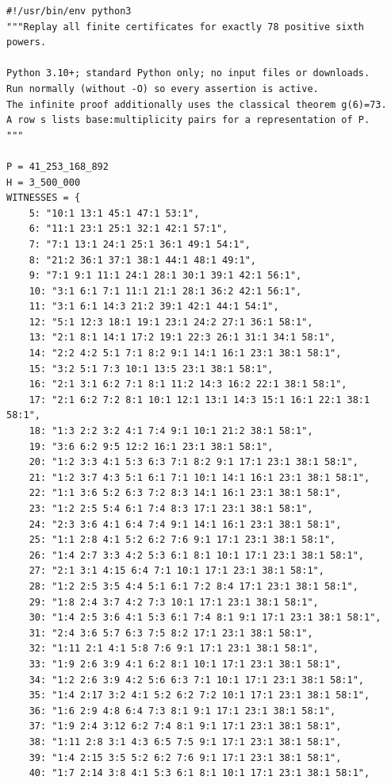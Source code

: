 \documentclass[11pt,a4paper]{article}
\numberwithin{equation}{section}
\theoremstyle{remark}
\begin{document}
\begin{Verbatim}[fontsize=\footnotesize,breaklines,breakanywhere]
#!/usr/bin/env python3
"""Replay all finite certificates for exactly 78 positive sixth powers.

Python 3.10+; standard Python only; no input files or downloads.
Run normally (without -O) so every assertion is active.
The infinite proof additionally uses the classical theorem g(6)=73.
A row s lists base:multiplicity pairs for a representation of P.
"""

P = 41_253_168_892
H = 3_500_000
WITNESSES = {
    5: "10:1 13:1 45:1 47:1 53:1",
    6: "11:1 23:1 25:1 32:1 42:1 57:1",
    7: "7:1 13:1 24:1 25:1 36:1 49:1 54:1",
    8: "21:2 36:1 37:1 38:1 44:1 48:1 49:1",
    9: "7:1 9:1 11:1 24:1 28:1 30:1 39:1 42:1 56:1",
    10: "3:1 6:1 7:1 11:1 21:1 28:1 36:2 42:1 56:1",
    11: "3:1 6:1 14:3 21:2 39:1 42:1 44:1 54:1",
    12: "5:1 12:3 18:1 19:1 23:1 24:2 27:1 36:1 58:1",
    13: "2:1 8:1 14:1 17:2 19:1 22:3 26:1 31:1 34:1 58:1",
    14: "2:2 4:2 5:1 7:1 8:2 9:1 14:1 16:1 23:1 38:1 58:1",
    15: "3:2 5:1 7:3 10:1 13:5 23:1 38:1 58:1",
    16: "2:1 3:1 6:2 7:1 8:1 11:2 14:3 16:2 22:1 38:1 58:1",
    17: "2:1 6:2 7:2 8:1 10:1 12:1 13:1 14:3 15:1 16:1 22:1 38:1 58:1",
    18: "1:3 2:2 3:2 4:1 7:4 9:1 10:1 21:2 38:1 58:1",
    19: "3:6 6:2 9:5 12:2 16:1 23:1 38:1 58:1",
    20: "1:2 3:3 4:1 5:3 6:3 7:1 8:2 9:1 17:1 23:1 38:1 58:1",
    21: "1:2 3:7 4:3 5:1 6:1 7:1 10:1 14:1 16:1 23:1 38:1 58:1",
    22: "1:1 3:6 5:2 6:3 7:2 8:3 14:1 16:1 23:1 38:1 58:1",
    23: "1:2 2:5 5:4 6:1 7:4 8:3 17:1 23:1 38:1 58:1",
    24: "2:3 3:6 4:1 6:4 7:4 9:1 14:1 16:1 23:1 38:1 58:1",
    25: "1:1 2:8 4:1 5:2 6:2 7:6 9:1 17:1 23:1 38:1 58:1",
    26: "1:4 2:7 3:3 4:2 5:3 6:1 8:1 10:1 17:1 23:1 38:1 58:1",
    27: "2:1 3:1 4:15 6:4 7:1 10:1 17:1 23:1 38:1 58:1",
    28: "1:2 2:5 3:5 4:4 5:1 6:1 7:2 8:4 17:1 23:1 38:1 58:1",
    29: "1:8 2:4 3:7 4:2 7:3 10:1 17:1 23:1 38:1 58:1",
    30: "1:4 2:5 3:6 4:1 5:3 6:1 7:4 8:1 9:1 17:1 23:1 38:1 58:1",
    31: "2:4 3:6 5:7 6:3 7:5 8:2 17:1 23:1 38:1 58:1",
    32: "1:11 2:1 4:1 5:8 7:6 9:1 17:1 23:1 38:1 58:1",
    33: "1:9 2:6 3:9 4:1 6:2 8:1 10:1 17:1 23:1 38:1 58:1",
    34: "1:2 2:6 3:9 4:2 5:6 6:3 7:1 10:1 17:1 23:1 38:1 58:1",
    35: "1:4 2:17 3:2 4:1 5:2 6:2 7:2 10:1 17:1 23:1 38:1 58:1",
    36: "1:6 2:9 4:8 6:4 7:3 8:1 9:1 17:1 23:1 38:1 58:1",
    37: "1:9 2:4 3:12 6:2 7:4 8:1 9:1 17:1 23:1 38:1 58:1",
    38: "1:11 2:8 3:1 4:3 6:5 7:5 9:1 17:1 23:1 38:1 58:1",
    39: "1:4 2:15 3:5 5:2 6:2 7:6 9:1 17:1 23:1 38:1 58:1",
    40: "1:7 2:14 3:8 4:1 5:3 6:1 8:1 10:1 17:1 23:1 38:1 58:1",

\end{Verbatim}
\end{document}
